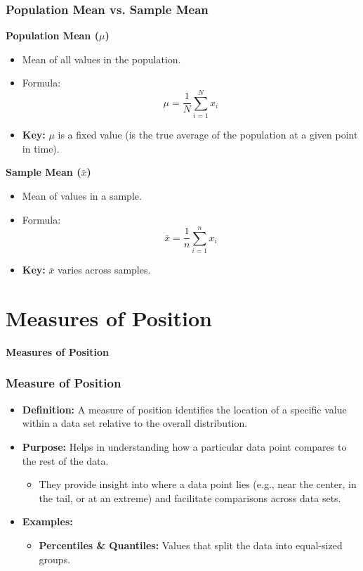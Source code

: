 \documentclass[handout]{beamer} %
\newcommand{\transitionslide}[1]{
    \begin{frame}[plain]
          \addtocounter{framenumber}{-1}
        \centering
        \vspace{1cm}
        \Huge
        \textcolor{moonstoneblue!150}{\textbf{#1}}
    \end{frame}
}
\begin{document}
\begin{frame}
\frametitle{Population Mean vs. Sample Mean}

\begin{minipage}{0.48\textwidth}
\centering
\textbf{Population Mean (\(\mu\))}

\begin{itemize}
    \item Mean of all values in the population.
    \item Formula: 
    \[
    \mu = \frac{1}{N} \sum_{i=1}^{N} x_i
    \]
    \item \textbf{Key:} $\mu$ is a fixed value (is the true average of the population at a given point in time).
\end{itemize}
\end{minipage}
\hfill
\begin{minipage}{0.48\textwidth}
\centering
\vspace{-3em}
\textbf{Sample Mean (\(\bar{x}\))}

\begin{itemize}
    \item Mean of values in a sample.
    \item Formula:
    \[
    \bar{x} = \frac{1}{n} \sum_{i=1}^{n} x_i
    \]
    \item \textbf{Key:} $\bar{x}$ varies across samples.
\end{itemize}
\end{minipage}

\end{frame}

\section{Measures of Position}
\transitionslide{Measures of Position}

\begin{frame} \frametitle{Measure of Position} 
\begin{itemize} 
\item \textbf{Definition:} A measure of position identifies the location of a specific value within a data set relative to the overall distribution.
\item \textbf{Purpose:} Helps in understanding how a particular data point compares to the rest of the data. 
\begin{itemize}
    \item They provide insight into where a data point lies (e.g., near the center, in the tail, or at an extreme) and facilitate comparisons across data sets.
\end{itemize}
\item \textbf{Examples:} 
\begin{itemize}
    \item \textbf{Percentiles \& Quantiles:} Values that split the data into equal-sized groups.
\end{itemize}

\end{itemize}
\end{frame}
\end{document}
